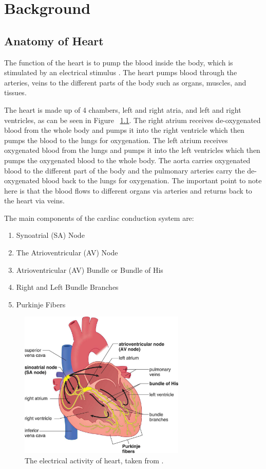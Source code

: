 \chapter{Background}


\section{Anatomy of Heart}
The function of the heart is to pump the blood inside the body, which is stimulated by an electrical stimulus \cite{wilkins2005ecg} \cite{electric_activity_heart}. The heart pumps blood through the arteries, veins to the different parts of the body such as organs, muscles, and tissues.

The heart is made up of 4 chambers, left and right atria, and left and right ventricles, as can be seen in Figure ~\ref{fig:heart_anatomy}. The right atrium receives de-oxygenated blood from the whole body and pumps it into the right ventricle which then pumps the blood to the lungs for oxygenation. The left atrium receives oxygenated blood from the lungs and pumps it into the left ventricles which then pumps the oxygenated blood to the whole body. The aorta carries oxygenated blood to the different part of the body and the pulmonary arteries carry the de-oxygenated blood back to the lungs for oxygenation. The important point to note here is that the blood flows to different organs via arteries and returns back to the heart via veins.

The main components of the cardiac conduction system are:
\begin{enumerate}
	\item Synoatrial (SA) Node
	\item The Atrioventricular (AV) Node
	\item Atrioventricular (AV) Bundle or Bundle of His
	\item Right and Left Bundle Branches
	\item Purkinje Fibers
\end{enumerate}


\begin{figure}[htpb]
	\centering
	\includegraphics[width=\textwidth,height=7cm,keepaspectratio=true]{images/electric_activity_heart}
	\caption{
		The electrical activity of heart, taken from \cite{electric_activity_heart}.
	}
	\label{fig:heart_anatomy}
\end{figure}




